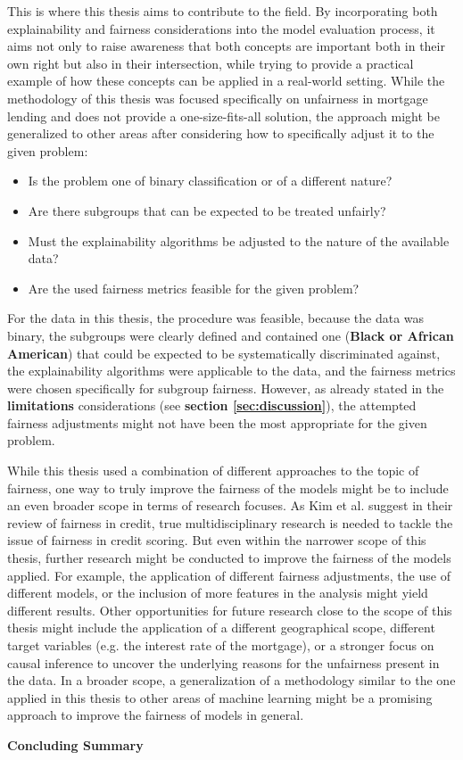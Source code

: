 This is where this thesis aims to contribute to the field. By incorporating both explainability and fairness considerations into the model evaluation process, it aims not only to raise awareness that both concepts are important both in their own right but also in their intersection, while trying to provide a practical example of how these concepts can be applied in a real-world setting.
While the methodology of this thesis was focused specifically on unfairness in mortgage lending and does not provide a one-size-fits-all solution, the approach might be generalized to other areas after considering how to specifically adjust it to the given problem:
\begin{itemize}
    \item Is the problem one of binary classification or of a different nature?
    \item Are there subgroups that can be expected to be treated unfairly?
    \item Must the explainability algorithms be adjusted to the nature of the available data?
    \item Are the used fairness metrics feasible for the given problem?
\end{itemize}
For the data in this thesis, the procedure was feasible, because the data was binary, the subgroups were clearly defined and contained one (\textbf{Black or African American}) that could be expected to be systematically discriminated against, the explainability algorithms were applicable to the data, and the fairness metrics were chosen specifically for subgroup fairness. 
However, as already stated in the \textbf{limitations} considerations (see \textbf{section \ref{sec:discussion}}), the attempted fairness adjustments might not have been the most appropriate for the given problem.

While this thesis used a combination of different approaches to the topic of fairness, one way to truly improve the fairness of the models might be to include an even broader scope in terms of research focuses.
As Kim et al. \parencite{Kim2023} suggest in their review of fairness in credit, true multidisciplinary research is needed to tackle the issue of fairness in credit scoring.
But even within the narrower scope of this thesis, further research might be conducted to improve the fairness of the models applied. For example, the application of different fairness adjustments, the use of different models, or the inclusion of more features in the analysis might yield different results.
Other opportunities for future research close to the scope of this thesis might include the application of a different geographical scope, different target variables (e.g. the interest rate of the mortgage), or a stronger focus on causal inference to uncover the underlying reasons for the unfairness present in the data.
In a broader scope, a generalization of a methodology similar to the one applied in this thesis to other areas of machine learning might be a promising approach to improve the fairness of models in general.

\textbf{Concluding Summary}